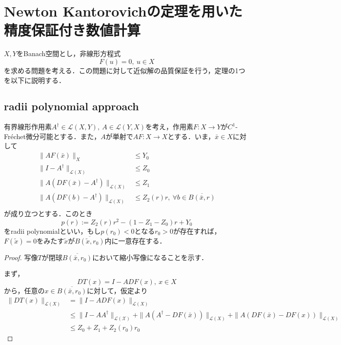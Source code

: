 
\chapter{Newton Kantorovichの定理を用いた精度保証付き数値計算}
$X,Y$をBanach空間とし，非線形方程式
\begin{equation*}
  F(u)=0,\ u\in X
\end{equation*}
を求める問題を考える．この問題に対して近似解の品質保証を行う，定理の1つを以下に説明する．

\section{radii polynomial approach \cite{github}}
\begin{thm}
  有界線形作用素$A^\dagger \in \mathcal{L}(X,Y),\ A\in \mathcal{L}(Y,X)$を考え，作用素$F:X\rightarrow Y$が$C^1$-Fr\'{e}chet微分可能とする．また，$A$が単射で$AF:X\rightarrow X$とする．いま，$\bar{x} \in X$に対して%
  \begin{align*}
    \|AF(\bar{x})\|_X                             & \leq Y_0                                             \\
    \|I-A^\dagger\|_{\mathcal{L}(X)}              & \leq Z_0                                             \\
    \|A(DF(\bar{x})-A^\dagger)\|_{\mathcal{L}(X)} & \leq Z_1                                             \\
    \|A(DF(b)-A^\dagger)\|_{\mathcal{L}(X)}       & \leq Z_2(r)r,\ \forall b \in \overline{B(\bar{x},r)} \\
  \end{align*}
  が成り立つとする．このとき
  \begin{equation*}
    p(r) := Z_2(r)r^2 - (1-Z_1-Z_0)r+Y_0
  \end{equation*}
  をradii polynomialといい，もし$p(r_0)<0$となる$r_0>0$が存在すれば，$F(\tilde{x})=0$をみたす$\tilde{x}$が$\overline{B(\tilde{x},r_0)}$内に一意存在する．
\end{thm}

\begin{proof}
  写像$T$が閉球$\overline{B(\bar{x},r_0)}$において縮小写像になることを示す．

  まず，
  \begin{equation*}
    DT(x)=I-ADF(x),\ x\in X
  \end{equation*}
  から，任意の$x\in \overline{B(\bar{x},r_0)}$に対して，仮定より
  \begin{align*}
    \|DT(x)\|_{\mathcal{L}(X)} & = \|I-ADF(x)\|_{\mathcal{L}(X)}                                                                                                  \\
                               & \leq \|I-AA^\dagger\|_\mathcal{L(X)} + \|A(A^\dagger-DF(\bar{x}))\|_{\mathcal{L}(X)} + \|A(DF(\bar{x})-DF(x))\|_{\mathcal{L}(X)} \\
                               & \leq Z_0 + Z_1 + Z_2(r_0)r_0
  \end{align*}
\end{proof}

